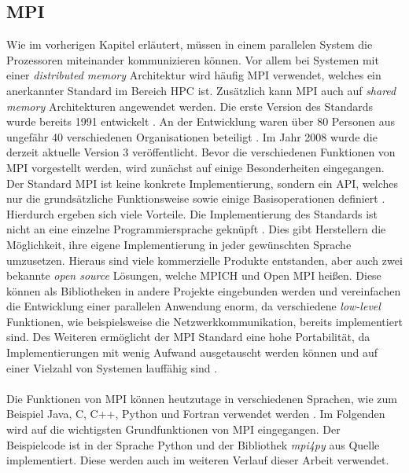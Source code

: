 \subsection{MPI}
\label{subsec:mpi}
Wie im vorherigen Kapitel erläutert, müssen in einem parallelen System die Prozessoren miteinander kommunizieren können. Vor allem bei Systemen mit einer \emph{distributed memory} Architektur wird häufig \ac{MPI} verwendet, welches ein anerkannter Standard im Bereich \ac{HPC} ist. Zusätzlich kann \ac{MPI} auch auf \emph{shared memory} Architekturen angewendet werden. Die erste Version des Standards wurde bereits 1991 entwickelt \cite{nielsen2016introduction}. An der Entwicklung waren über 80 Personen aus ungefähr 40 verschiedenen Organisationen beteiligt \cite{dongarra1995introduction}. Im Jahr 2008 wurde die derzeit aktuelle Version 3 veröffentlicht. Bevor die verschiedenen Funktionen von \ac{MPI} vorgestellt werden, wird zunächst auf einige Besonderheiten eingegangen. Der Standard \ac{MPI} ist keine konkrete Implementierung, sondern ein \ac{API}, welches nur die grundsätzliche Funktionsweise sowie einige Basisoperationen definiert \cite{nielsen2016introduction}. Hierdurch ergeben sich viele Vorteile. Die Implementierung des Standards ist nicht an eine einzelne Programmiersprache geknüpft \cite{nielsen2016introduction}. Dies gibt Herstellern die Möglichkeit, ihre eigene Implementierung in jeder gewünschten Sprache umzusetzen. Hieraus sind viele kommerzielle Produkte entstanden, aber auch zwei bekannte \emph{open source} Lösungen, welche MPICH und Open MPI heißen. Diese können als Bibliotheken in andere Projekte eingebunden werden und vereinfachen die Entwicklung einer parallelen Anwendung enorm, da verschiedene \emph{low-level} Funktionen, wie beispielsweise die Netzwerkkommunikation, bereits implementiert sind. Des Weiteren ermöglicht der \ac{MPI} Standard eine hohe Portabilität, da Implementierungen mit wenig Aufwand ausgetauscht werden können und auf einer Vielzahl von Systemen lauffähig sind \cite{dalcin2008mpi}.
\\\\
Die Funktionen von \ac{MPI} können heutzutage in verschiedenen Sprachen, wie zum Beispiel Java, C, C++, Python und Fortran verwendet werden \cite{nielsen2016introduction}. Im Folgenden wird auf die wichtigsten Grundfunktionen von \ac{MPI} eingegangen. Der Beispielcode ist in der Sprache Python und der Bibliothek \emph{mpi4py} aus Quelle \cite{dalcin2008mpi} implementiert. Diese werden auch im weiteren Verlauf dieser Arbeit verwendet.
